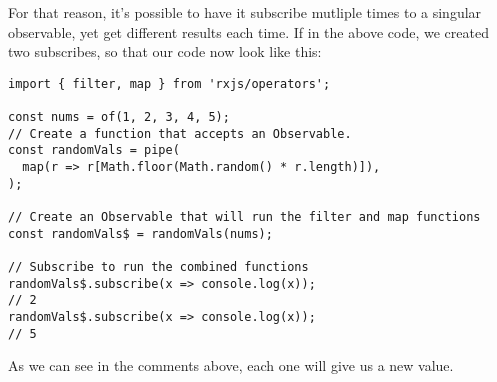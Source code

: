 For that reason, it's possible to have it subscribe mutliple times to a singular observable, yet get different results each time. If in the above 
code, we created two subscribes, so that our code now look like this: 
\begin{lstlisting}[caption=observable with two subscribes]
import { filter, map } from 'rxjs/operators';

const nums = of(1, 2, 3, 4, 5);
// Create a function that accepts an Observable.
const randomVals = pipe( 
  map(r => r[Math.floor(Math.random() * r.length)]),
);

// Create an Observable that will run the filter and map functions
const randomVals$ = randomVals(nums);

// Subscribe to run the combined functions
randomVals$.subscribe(x => console.log(x));
// 2
randomVals$.subscribe(x => console.log(x));
// 5
\end{lstlisting}

As we can see in the comments above, each one will give us a new value.

